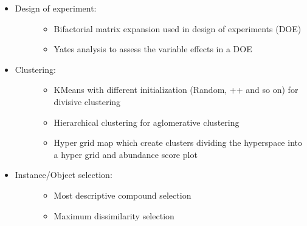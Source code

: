 \documentclass[letterpaper,10pt,english]{sphinxmanual}
\begin{document}
\begin{itemize}
\begin{description}
\begin{itemize}
\end{itemize}

\end{description}

\item {} \begin{description}
\item[{Design of experiment:}] \leavevmode\begin{itemize}
\item {} 
\sphinxAtStartPar
Bifactorial matrix expansion used in design of experiments (DOE)

\item {} 
\sphinxAtStartPar
Yates analysis to assess the variable effects in a DOE

\end{itemize}

\end{description}

\item {} \begin{description}
\item[{Clustering:}] \leavevmode\begin{itemize}
\item {} 
\sphinxAtStartPar
K\sphinxhyphen{}Means with different initialization (Random, ++ and so on) for divisive clustering

\item {} 
\sphinxAtStartPar
Hierarchical clustering for aglomerative clustering

\item {} 
\sphinxAtStartPar
Hyper grid map which create clusters dividing the hyperspace into a hyper grid and abundance score plot

\end{itemize}

\end{description}

\item {} \begin{description}
\item[{Instance/Object selection:}] \leavevmode\begin{itemize}
\item {} 
\sphinxAtStartPar
Most descriptive compound selection

\item {} 
\sphinxAtStartPar
Maximum dissimilarity selection

\end{itemize}


\end{description}
\end{itemize}
\end{document}
